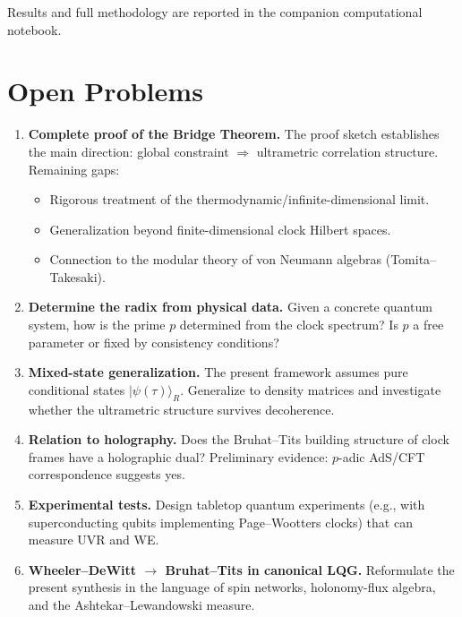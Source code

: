 \documentclass[12pt,a4paper]{article}
\theoremstyle{definition}
\newcommand{\ket}[1]{|#1\rangle}
\begin{document}
Results and full methodology are reported in the companion computational notebook.

\section{Open Problems}

\begin{enumerate}[label=\textbf{OP\arabic*:},leftmargin=*]

\item \textbf{Complete proof of the Bridge Theorem.} The proof sketch \cite{bridgetheorem} establishes the main direction: global constraint $\Rightarrow$ ultrametric correlation structure. Remaining gaps:
\begin{itemize}[nosep]
\item Rigorous treatment of the thermodynamic/infinite-dimensional limit.
\item Generalization beyond finite-dimensional clock Hilbert spaces.
\item Connection to the modular theory of von Neumann algebras (Tomita--Takesaki).
\end{itemize}

\item \textbf{Determine the radix from physical data.} Given a concrete quantum system, how is the prime $p$ determined from the clock spectrum? Is $p$ a free parameter or fixed by consistency conditions?

\item \textbf{Mixed-state generalization.} The present framework assumes pure conditional states $\ket{\psi(\tau)}_R$. Generalize to density matrices and investigate whether the ultrametric structure survives decoherence.

\item \textbf{Relation to holography.} Does the Bruhat--Tits building structure of clock frames have a holographic dual? Preliminary evidence: $p$-adic AdS/CFT correspondence \cite{gubser2017padic} suggests yes.

\item \textbf{Experimental tests.} Design tabletop quantum experiments (e.g., with superconducting qubits implementing Page--Wootters clocks) that can measure UVR and WE.

\item \textbf{Wheeler--DeWitt $\to$ Bruhat--Tits in canonical LQG.} Reformulate the present synthesis in the language of spin networks, holonomy-flux algebra, and the Ashtekar--Lewandowski measure.

\end{enumerate}
\end{document}
